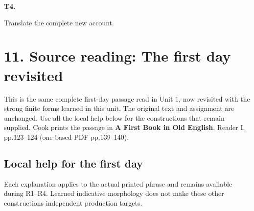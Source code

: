 \par\begin{minipage}{\linewidth}\raggedright
\textbf{T4.}

Translate the complete new account.

\end{minipage}\par\addvspace{4pt}

\section*{11. Source reading: The first day revisited}

This is the same complete first-day passage read in Unit 1, now revisited with the strong finite forms learned in this unit. The original text and assignment are unchanged. Use all the local help below for the constructions that remain supplied. Cook prints the passage in \textbf{A First Book in Old English}, Reader I, pp.123–124 (one-based PDF pp.139–140).

\par\begin{minipage}{\linewidth}\raggedright
{}
\end{minipage}\par

\subsection*{Local help for the first day}

Each explanation applies to the actual printed phrase and remains available during R1–R4. Learned indicative morphology does not make these other constructions independent production targets.

